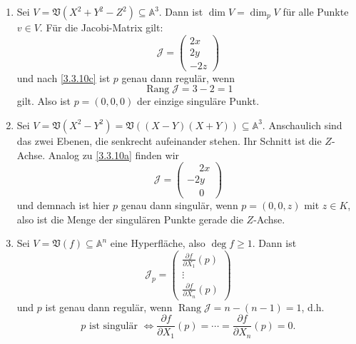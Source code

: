 \documentclass[a4paper,12pt,index=toc]{scrbook}
\theoremstyle{keinenummern} %
\def\A{\mathbb{A}}
\def\V{\mathfrak{V}}
\newcommand{\J}{\mathcal{J}}
\newcommand{\Rang}{\operatorname{Rang}}
\begin{document}
\begin{bsp}\label{3.3.11}\begin{enumerate}
\item{} Sei $V=\V(X^{2}+Y^{2}-Z^{2})\subseteq\A^{3}$. Dann ist $\dim V=\dim_{p}V$ für alle Punkte $v\in V$. Für die Jacobi-Matrix gilt:
\begin{equation*}\J=\left(\!\!\begin{array}{r}2x\\2y\\-2z\end{array}\!\right)\end{equation*}
und nach \cref{3.3.10c} ist $p$ genau dann regulär, wenn \begin{equation*}\Rang\J=3-2=1\end{equation*} gilt. Also ist $p=(0,0,0)$ der einzige singuläre Punkt.
\item{} Sei $V=\V(X^{2}-Y^{2})=\V((X-Y)(X+Y))\subseteq\A^{3}$. Anschaulich sind das zwei Ebenen, die senkrecht aufeinander stehen. Ihr Schnitt ist die $Z$-Achse. Analog zu \ref{3.3.10a} finden wir
\begin{equation*}\J=\left(\!\!\begin{array}{c}\phantom{-}2x\\-2y\\\phantom{-}0\end{array}\!\right)\end{equation*}
und demnach ist hier $p$ genau dann singulär, wenn $p=(0,0,z)$ mit $z\in K$, also ist die Menge der singulären Punkte gerade die $Z$-Achse.
\item{} Sei $V=\V(f)\subseteq\A^{n}$ eine Hyperfläche, also $\deg f\geq 1$. Dann ist
\begin{equation*}\J_{p}=\left(\!\!\begin{array}{c}\frac{\partial f}{\partial X_{1}}(p)\\\vdots\\\frac{\partial f}{\partial X_{n}}(p)\end{array}\!\right)\end{equation*}
und $p$ ist genau dann regulär, wenn $\Rang\J=n-(n-1)=1$, d.h.
\begin{equation*}p\text{ ist singulär }\iff\frac{\partial f}{\partial X_{1}}(p)=\dotsm=\frac{\partial f}{\partial X_{n}}(p)=0.\end{equation*}
\end{enumerate}\end{bsp}
\end{document}
